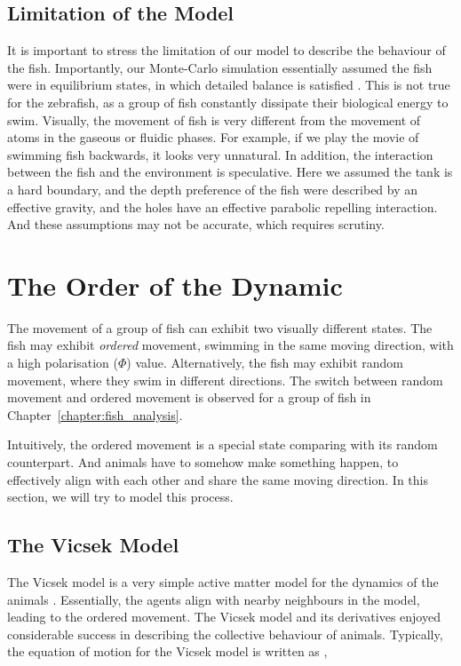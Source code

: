 \documentclass[11pt,twoside]{report}
\begin{document}
\subsection{Limitation of the Model}

It is important to stress the limitation of our model to describe the behaviour of the fish. Importantly, our Monte-Carlo simulation essentially assumed the fish were in equilibrium states, in which detailed balance is satisfied \cite{newman1999}. This is not true for the zebrafish, as a group of fish constantly dissipate their biological energy to swim. Visually, the movement of fish is very different from the movement of atoms in the gaseous or fluidic phases. For example, if we play the movie of swimming fish backwards, it looks very unnatural. In addition, the interaction between the fish and the environment is speculative. Here we assumed the tank is a hard boundary, and the depth preference of the fish were described by an effective gravity, and the holes have an effective parabolic repelling interaction. And these assumptions may not be accurate, which requires scrutiny.


\section{The Order of the Dynamic}
\label{section:simulate-dynamics}

The movement of a group of fish can exhibit two visually different states. The fish may exhibit \emph{ordered} movement, swimming in the same moving direction, with a high polarisation ($\Phi$) value. Alternatively, the fish may exhibit random movement, where they swim in different directions. The switch between random movement and ordered movement is observed for a group of fish in Chapter~\ref{chapter:fish_analysis}.

Intuitively, the ordered movement is a special state comparing with its random counterpart. And animals have to somehow make something happen, to effectively align with each other and share the same moving direction. In this section, we will try to model this process.


\subsection{The Vicsek Model}
\label{section:vicsek-model}


The Vicsek model is a very simple active matter model for the dynamics of the animals \cite{vicsek1995}. Essentially, the agents align with nearby neighbours in the model, leading to the ordered movement.
The Vicsek model and its derivatives enjoyed considerable success in describing the collective behaviour of animals. Typically, the equation of motion for the Vicsek model is written as \cite{vicsek1995},
\end{document}
